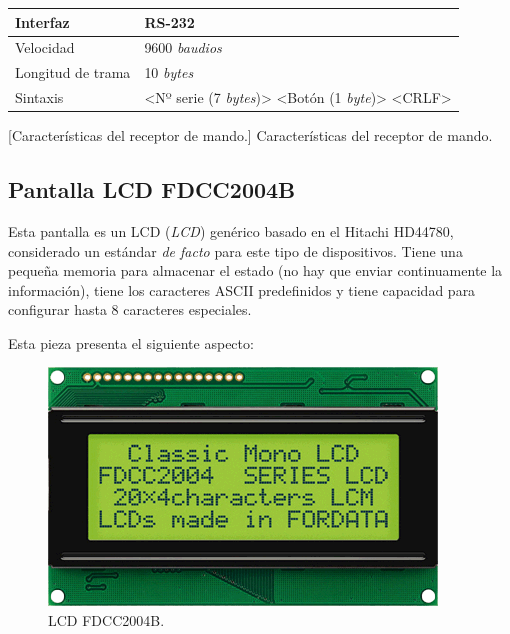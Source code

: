 \smallskip

\begin{center}
	\begin{tabular}{|l|l|}
		\hline Interfaz & RS-232 \\
		\hline Velocidad & 9600 \textit{baudios} \\ 
		\hline Longitud de trama & 10 \textit{bytes} \\ 
		\hline Sintaxis & <Nº serie (7 \textit{bytes})> <Botón (1 \textit{byte})> <CRLF> \\ 
		\hline 
	\end{tabular}
	\smallskip
	[Características del receptor de mando.]{\label{tab:info_recv} Características del receptor de mando. \cite{datasheet_decoder}}
\end{center}

\smallskip

\subsection{Pantalla LCD FDCC2004B}

Esta pantalla es un \acrshort{LCD} (\textit{\acrlong{LCD}}) genérico basado en el Hitachi HD44780, considerado un estándar \textit{de facto} para este tipo de dispositivos. Tiene una pequeña memoria para almacenar el estado (no hay que enviar continuamente la información), tiene los caracteres \acrshort{ASCII} predefinidos y tiene capacidad para configurar hasta 8 caracteres especiales.

Esta pieza presenta el siguiente aspecto:

\smallskip

\begin{figure}[H]
	\noindent \begin{centering}
		\includegraphics[width=\linewidth/2]{capitulo3/FDCC2004B}
		\par\end{centering}
	\smallskip
	\caption{\label{fig:FDCC2004B} LCD FDCC2004B.}
\end{figure} 

